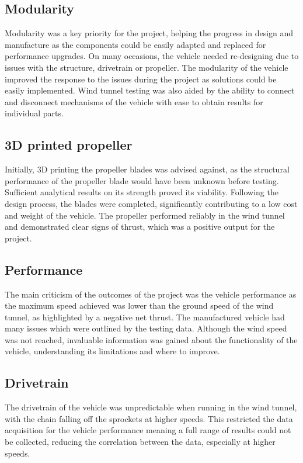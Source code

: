 \subsection{Modularity}

Modularity was a key priority for the project, helping the progress in design and manufacture as the components could be easily adapted and replaced for performance upgrades. On many occasions, the vehicle needed re-designing due to issues with the structure, drivetrain or propeller. The modularity of the vehicle improved the response to the issues during the project as solutions could be easily implemented. Wind tunnel testing was also aided by the ability to connect and disconnect mechanisms of the vehicle with ease to obtain results for individual parts.

\subsection{3D printed propeller}

Initially, 3D printing the propeller blades was advised against, as the structural performance of the propeller blade would have been unknown before testing. Sufficient analytical results on its strength proved its viability. Following the design process, the blades were completed, significantly contributing to a low cost and weight of the vehicle. The propeller performed reliably in the wind tunnel and demonstrated clear signs of thrust, which was a positive output for the project.

\subsection{Performance}

The main criticism of the outcomes of the project was the vehicle performance as the maximum speed achieved was lower than the ground speed of the wind tunnel, as highlighted by a negative net thrust. The manufactured vehicle had many issues which were outlined by the testing data. Although the wind speed was not reached, invaluable information was gained about the functionality of the vehicle, understanding its limitations and where to improve.

\subsection{Drivetrain}

The drivetrain of the vehicle was unpredictable when running in the wind tunnel, with the chain falling off the sprockets at higher speeds. This restricted the data acquisition for the vehicle performance meaning a full range of results could not be collected, reducing the correlation between the data, especially at higher speeds.

